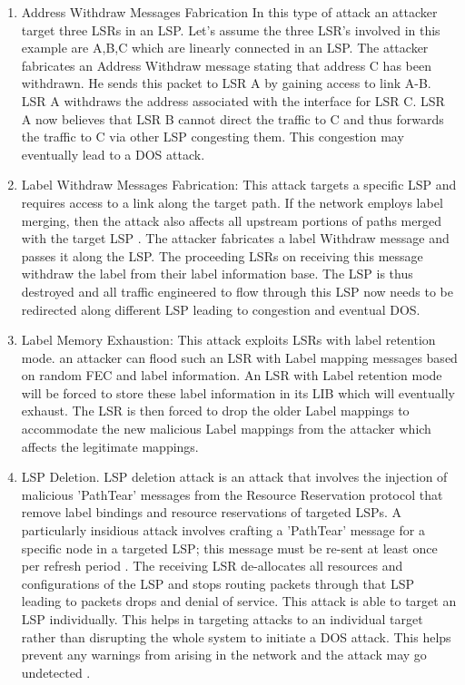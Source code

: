 \begin{enumerate}
\item Address Withdraw Messages Fabrication
In this type of attack an attacker target three LSRs in an LSP. Let’s assume the three LSR's involved in this example are A,B,C which are linearly connected in an LSP. The attacker fabricates an Address Withdraw message stating that address C has been withdrawn. He sends this packet to LSR A by gaining access to link A-B. LSR A withdraws the address associated with the interface for LSR C. LSR A now believes that LSR B cannot direct the traffic to C and thus forwards the traffic to C via other LSP congesting them. This congestion may eventually lead to a DOS attack.

\item Label Withdraw Messages Fabrication:
This attack targets a specific LSP and requires access to a link along the target path. If the network employs label merging, then the attack also affects all upstream portions of paths merged with the target LSP \cite{guernsey2010security}. The attacker fabricates a label Withdraw message and passes it along the LSP. The proceeding LSRs on receiving this message withdraw the label from their label information base. The LSP is thus destroyed and all traffic engineered to flow through this LSP now needs to be redirected along different LSP leading to congestion and eventual DOS.

\item Label Memory Exhaustion:
This attack exploits LSRs with label retention mode. an attacker can flood such an LSR with Label mapping messages based on random FEC and label information. An LSR with Label retention mode will be forced to store these label information in its LIB which will eventually exhaust. The LSR is then forced to drop the older Label mappings to accommodate the new malicious Label mappings from the attacker which affects the legitimate mappings.

\item LSP Deletion.
LSP deletion attack is an attack that involves the injection of malicious 'PathTear' messages from the Resource Reservation protocol that remove label bindings and resource reservations of targeted LSPs. A particularly insidious attack involves crafting a 'PathTear' message for a specific node in a targeted LSP; this message must be re-sent at least once per refresh period \cite{spainhower2008security}. The receiving LSR de-allocates all resources and configurations of the LSP and stops routing packets through that LSP leading to packets drops and denial of service.
This attack is able to target an LSP individually. This helps in targeting attacks to an individual target rather than disrupting the whole system to initiate a DOS attack. This helps prevent any warnings from arising in the network and the attack may go undetected \cite{spainhower2008security}.  
\end{enumerate}
    
